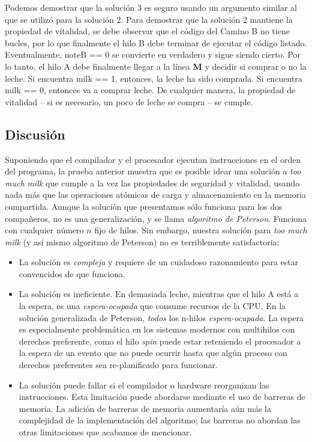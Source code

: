 \documentclass[10pt]{book}
\begin{document}
Podemos demostrar que la solución 3 es seguro usando un argumento similar al que se utilizó para la solución 2. Para demostrar que la solución 2 mantiene la propiedad de vitalidad, se debe observar que el código del {\mf Camino B} no tiene bucles, por lo que finalmente el hilo B debe terminar de ejecutar el código listado. Eventualmente, {\mf noteB == 0} se convierte en verdadero y sigue siendo cierto. Por lo tanto, el hilo A debe finalmente llegar a la línea \textbf{M} y decidir si comprar o no la leche. Si encuentra {\mf milk == 1}, entonces, la leche ha sido comprada. Si encuentra {\mf milk == 0}, entonces va a comprar leche. De cualquier manera, la propiedad de vitalidad -- si es necesario, un poco de leche se compra -- se cumple.

\subsection{Discusión}
Suponiendo que el compilador y el procesador ejecutan instrucciones en el orden del programa, la prueba anterior muestra que es posible idear una solución a \textit{too much milk} que cumple a la vez las propiedades de seguridad y vitalidad, usando nada más que las operaciones atómicas de carga y almacenamiento en la memoria compartida. Aunque la solución que presentamos sólo funciona para los dos compañeros, no es una generalización, y se llama \textit{algoritmo de Peterson}. Funciona con cualquier número $n$ fijo de hilos. Sin embargo, nuestra solución para \textit{too much milk} (y así mismo algoritmo de Peterson) no es terriblemente satisfactoria:
\begin{itemize}
\item La solución es \textit{compleja} y requiere de un cuidadoso razonamiento para estar convencidos de que funciona.
\item La solución es ineficiente. En demasiada leche, mientras que el hilo A está a la espera, es una \textit{espera-ocupada} que consume recursos de la CPU. En la solución generalizada de Peterson, \textit{todos} los n-hilos \textit{espera-ocupada}. La espera es especialmente problemática en los sistemas modernos con multihilos con derechos preferente, como el hilo \textit{spin} puede estar reteniendo el procesador a la espera de un evento que no puede ocurrir hasta que algún proceso con derechos preferentes sea re-planificado para funcionar.
\item La solución puede fallar si el compilador o hardware reorganizan las instrucciones. Esta limitación puede abordarse mediante el uso de barreras de memoria. La adición de barreras de memoria aumentaría aún más la complejidad de la implementación del algoritmo; las barreras no abordan las otras limitaciones que acabamos de mencionar.
\end{itemize}
\end{document}
